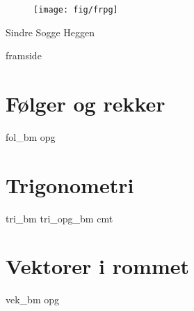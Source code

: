 




\addto\captionsenglish{\renewcommand{\figurename}{Figur}}
\makeatletter
\addto\captionsenglish{\renewcommand{\chaptername}{Kapittel}}
\addto\captionsenglish{\renewcommand{\contentsname}{Innhold}}



	
	\pagecolor{blue!20}
	
	\begin{titlepage}
		\begin{center}
			\vspace*{1cm}
			
			{}
			
			\vspace{2.45cm} 
			\begin{figure}[H]
				\centering
				\qquad\texttt{[image: fig/frpg]}
			\end{figure}           
			\vspace{2 cm}
			\raggedleft Sindre Sogge Heggen   \end{center}
	\end{titlepage}
	\pagecolor{white}
\newpage
\phantom{}
\thispagestyle{empty}	
\newpage	
{framside}
\newpage

\footnotesize
\tableofcontents
\normalsize
\chapter{Følger og rekker\label{Folgerogrekker}}
\vspace{20pt}
{fol_bm}
\newpage
{opg}

\chapter{Trigonometri\label{Trigonometri}}
\vspace{20pt}
{tri_bm}
\newpage
{tri_opg_bm}
\newpage
{cmt}

\chapter{Vektorer i rommet\label{Vektorerirommet}}
\vspace{20pt}
{vek_bm}
\newpage
{opg}

